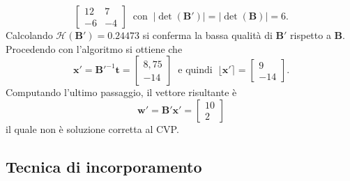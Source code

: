 \begin{exmp}
\[\begin{bmatrix}
            12 & 7\\
            -6 & -4
        \end{bmatrix}
        \ \text{ con } \ |\det(\mathbf{B}')| = |\det(\mathbf{B})| = 6.
    \]
    Calcolando $\mathcal{H}(\mathbf{B}') = 0.24473$ si conferma la bassa qualità di $\mathbf{B}'$ 
    rispetto a $\mathbf{B}$. Procedendo con l'algoritmo si ottiene che 
    \[
    \mathbf{x}' = \mathbf{B}'^{-1}\mathbf{t}=
    \begin{bmatrix}
        8,75\\
        -14
    \end{bmatrix}
    \ \text{ e quindi } \ \lfloor\mathbf{x}'\rceil = 
    \begin{bmatrix}
        9\\
        -14
    \end{bmatrix}.
    \]
    Computando l'ultimo passaggio, il vettore risultante è
    \[
        \mathbf{w}' = \mathbf{B}'\mathbf{x}' =
        \begin{bmatrix}
            10\\
            2
        \end{bmatrix}
    \]
    il quale non è soluzione corretta al CVP. 
\end{exmp}

\subsection{Tecnica di incorporamento}